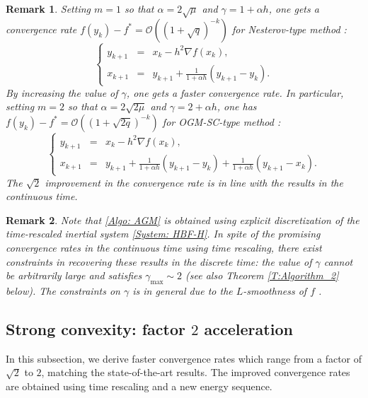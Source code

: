 \documentclass[pdflatex,sn-mathphys-num]{sn-jnl}
\theoremstyle{thmstyleone}
\theoremstyle{thmstyletwo}
\newtheorem{remark}{Remark}
\theoremstyle{thmstylethree}
\begin{document}
\begin{remark}
Setting $m=1$ so that $\alpha=2\sqrt{\mu}$ and $\gamma=1+\alpha h$, one gets a convergence rate $f(y_k)-f^*=\mathcal{O}\left( (1+\sqrt{q})^{-k} \right)$ for Nesterov-type method \cite{Nesterov_2004}:
\begin{equation*}
\left\{
\begin{array}{rcl}
y_{k+1} & = & x_k - h^2 \nabla f(x_k),\\[2pt]
x_{k+1} & = & y_{k+1} + \frac{1}{1 + \alpha h}( y_{k+1} - y_k ).
\end{array}
\right.
\end{equation*} 
By increasing the value of $\gamma$, one gets a faster convergence rate. In particular, setting $m=2$ so that $\alpha=2\sqrt{2\mu}$ and $\gamma=2+\alpha h$, one has $f(y_k)-f^*=\mathcal{O}\left( (1+\sqrt{2q})^{-k} \right)$ for OGM-SC-type method \cite{Park_2023}: 
\begin{equation*}
\left\{
\begin{array}{rcl}
y_{k+1} & = & x_k - h^2 \nabla f(x_k),\\[2pt]
x_{k+1} & = & y_{k+1} + \frac{1}{1 + \alpha h}( y_{k+1} - y_k ) + \frac{1}{1 + \alpha h} ( y_{k+1} - x_k ).
\end{array}
\right.
\end{equation*} 
The $\sqrt{2}$ improvement in the convergence rate is in line with the results in the continuous time. 
\end{remark}


\begin{remark}
Note that \eqref{Algo: AGM} is obtained using {\it explicit discretization} of the time-rescaled inertial system \eqref{System: HBF-H}. In spite of the promising convergence rates in the continuous time using time rescaling, there exist constraints in recovering these results in the discrete time: the value of $\gamma$ cannot be arbitrarily large and satisfies $\gamma_{\max}\sim 2$ (see also Theorem \ref{T:Algorithm_2} below). The constraints on $\gamma$ is in general due to the $L$-smoothness of $f$ \cite{Attouch_2019_proximal}. 
\end{remark}


\subsection{Strong convexity: factor \texorpdfstring{$2$}{} acceleration}\label{SS:Algorithms_2}
In this subsection, we derive faster convergence rates which range from a factor of $\sqrt{2}$ to $2$, matching the state-of-the-art results. The improved convergence rates are obtained using time rescaling and a new energy sequence.
\end{document}

